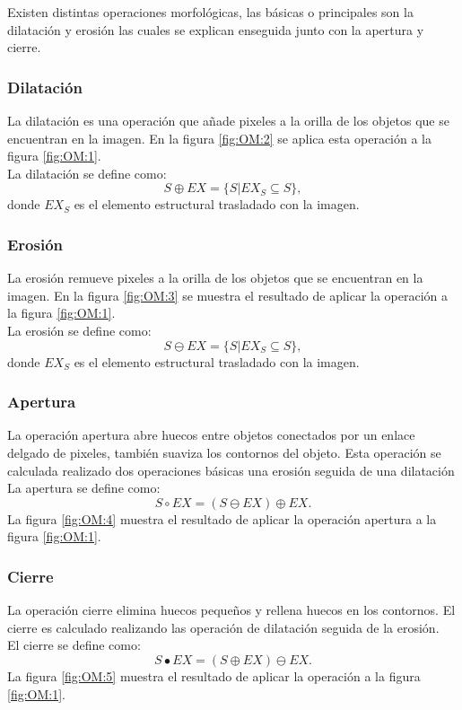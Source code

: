 Existen distintas operaciones morfológicas, las básicas o principales son la dilatación y erosión las cuales se explican enseguida junto con la apertura y cierre. 
 
\subsubsection{Dilatación}\label{sssec:Dilatation}
La dilatación es una operación que añade pixeles a la orilla de los objetos que se encuentran en la imagen. En la figura \ref{fig:OM:2} 
se aplica esta operación a la figura \ref{fig:OM:1}.\\
La dilatación se define como:  
$$S \oplus EX = \lbrace S|EX_S \subseteq S \rbrace,$$  
donde $EX_S$ es el elemento estructural trasladado con la imagen. 

\subsubsection{Erosión}\label{sssec:OMerosion}
La erosión remueve pixeles a la orilla de los objetos que se encuentran en la imagen. En la figura \ref{fig:OM:3} se muestra el resultado de aplicar la operación a la figura \ref{fig:OM:1}.\\ 
La erosión se define como: 
$$S \ominus EX = \lbrace S|EX_S \subseteq S \rbrace,$$ 
donde $EX_S$ es el elemento estructural trasladado con la imagen. 

\subsubsection{Apertura}\label{sssec:Opening} 
La operación apertura abre huecos entre objetos conectados por un enlace delgado de pixeles, también suaviza los contornos del objeto. Esta operación se calculada realizado dos operaciones básicas una erosión seguida de una dilatación \\ 
La apertura se define como:  
$$S \circ EX = (S \ominus EX) \oplus EX.$$ 
La figura \ref{fig:OM:4} muestra el resultado de aplicar la operación apertura a la figura \ref{fig:OM:1}.

\subsubsection{Cierre}\label{sssec:Closure}
La operación cierre elimina huecos pequeños y rellena huecos en los contornos. El cierre es calculado realizando las operación de dilatación seguida de la erosión.\\
El cierre se define como:
$$S \bullet EX = (S \oplus EX) \ominus EX.$$
La figura \ref{fig:OM:5} muestra el resultado de aplicar la operación a la figura \ref{fig:OM:1}.

